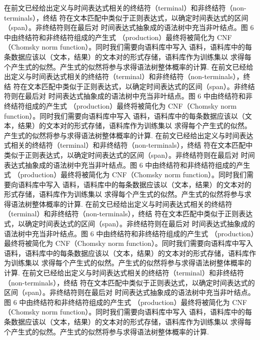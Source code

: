 在前文已经给出定义与时间表达式相关的终结符（terminal）和非终结符（non-terminals），终结
符在文本匹配中类似于正则表达式，以确定时间表达式的区间（span）。非终结符则在最后对
时间表达式抽象成的语法树中充当非叶结点。图 6 中由终结符和非终结符组成的产生式
（production）最终将被简化为 CNF（Chomsky norm function）。同时我们需要向语料库中写入
语料，语料库中的每条数据应该以（文本，结果）的文本对的形式存储，语料库作为训练集以
求得每个产生式的似然。产生式的似然将参与求得语法树整体概率的计算.
在前文已经给出定义与时间表达式相关的终结符（terminal）和非终结符（non-terminals），终结
符在文本匹配中类似于正则表达式，以确定时间表达式的区间（span）。非终结符则在最后对
时间表达式抽象成的语法树中充当非叶结点。图 6 中由终结符和非终结符组成的产生式
（production）最终将被简化为 CNF（Chomsky norm function）。同时我们需要向语料库中写入
语料，语料库中的每条数据应该以（文本，结果）的文本对的形式存储，语料库作为训练集以
求得每个产生式的似然。产生式的似然将参与求得语法树整体概率的计算.
在前文已经给出定义与时间表达式相关的终结符（terminal）和非终结符（non-terminals），终结
符在文本匹配中类似于正则表达式，以确定时间表达式的区间（span）。非终结符则在最后对
时间表达式抽象成的语法树中充当非叶结点。图 6 中由终结符和非终结符组成的产生式
（production）最终将被简化为 CNF（Chomsky norm function）。同时我们需要向语料库中写入
语料，语料库中的每条数据应该以（文本，结果）的文本对的形式存储，语料库作为训练集以
求得每个产生式的似然。产生式的似然将参与求得语法树整体概率的计算.
在前文已经给出定义与时间表达式相关的终结符（terminal）和非终结符（non-terminals），终结
符在文本匹配中类似于正则表达式，以确定时间表达式的区间（span）。非终结符则在最后对
时间表达式抽象成的语法树中充当非叶结点。图 6 中由终结符和非终结符组成的产生式
（production）最终将被简化为 CNF（Chomsky norm function）。同时我们需要向语料库中写入
语料，语料库中的每条数据应该以（文本，结果）的文本对的形式存储，语料库作为训练集以
求得每个产生式的似然。产生式的似然将参与求得语法树整体概率的计算.
在前文已经给出定义与时间表达式相关的终结符（terminal）和非终结符（non-terminals），终结
符在文本匹配中类似于正则表达式，以确定时间表达式的区间（span）。非终结符则在最后对
时间表达式抽象成的语法树中充当非叶结点。图 6 中由终结符和非终结符组成的产生式
（production）最终将被简化为 CNF（Chomsky norm function）。同时我们需要向语料库中写入
语料，语料库中的每条数据应该以（文本，结果）的文本对的形式存储，语料库作为训练集以
求得每个产生式的似然。产生式的似然将参与求得语法树整体概率的计算.



